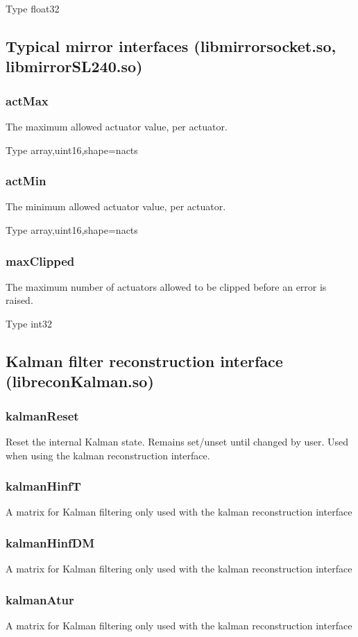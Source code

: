 \documentclass[a4,10pt]{article}
\begin{document}
Type float32

\subsection{Typical mirror interfaces (libmirrorsocket.so, libmirrorSL240.so)}

\subsubsection{actMax}
The maximum allowed actuator value, per actuator.

Type array,uint16,shape=nacts

\subsubsection{actMin}
The minimum allowed actuator value, per actuator.

Type array,uint16,shape=nacts

\subsubsection{maxClipped}
The maximum number of actuators allowed to be clipped before an error
is raised.

Type int32

\subsection{Kalman filter reconstruction interface (libreconKalman.so)}
\subsubsection{kalmanReset}
Reset the internal Kalman state.  Remains set/unset until changed by
user.  Used when using the kalman reconstruction interface.

\subsubsection{kalmanHinfT}
A matrix for Kalman filtering only used with the kalman reconstruction interface

\subsubsection{kalmanHinfDM}
A matrix for Kalman filtering only used with the kalman reconstruction interface

\subsubsection{kalmanAtur}
A matrix for Kalman filtering only used with the kalman reconstruction interface
\end{document}
